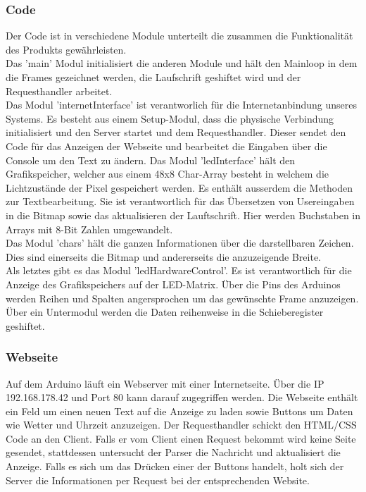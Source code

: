 \documentclass[10pt,a4paper]{article}
\begin{document}
\subsubsection{Code}

Der Code ist in verschiedene Module unterteilt die zusammen die Funktionalität des Produkts gewährleisten.\\
Das 'main' Modul initialisiert die anderen Module und hält den Mainloop in dem die Frames gezeichnet werden, die Laufschrift geshiftet wird und der Requesthandler arbeitet.\\
Das Modul 'internetInterface' ist verantworlich für die Internetanbindung unseres Systems. Es besteht aus einem Setup-Modul, dass die physische Verbindung initialisiert und den Server startet und dem Requesthandler. Dieser sendet den Code für das Anzeigen der Webseite und bearbeitet die Eingaben über die Console um den Text zu ändern. 
Das Modul 'ledInterface' hält den Grafikspeicher, welcher aus einem 48x8 Char-Array besteht in welchem die Lichtzustände der Pixel gespeichert werden. Es enthält ausserdem die Methoden zur Textbearbeitung. Sie ist verantwortlich für das Übersetzen von Usereingaben in die Bitmap sowie das aktualisieren der Lauftschrift. Hier werden Buchstaben in Arrays mit 8-Bit Zahlen umgewandelt.\\
Das Modul 'chars' hält die ganzen Informationen über die darstellbaren Zeichen. Dies sind einerseits die Bitmap und andererseits die anzuzeigende Breite.\\
Als letztes gibt es das Modul 'ledHardwareControl'. Es ist verantwortlich für die Anzeige des Grafikspeichers auf der LED-Matrix. Über die Pins des Arduinos werden Reihen und Spalten angersprochen um das gewünschte Frame anzuzeigen. Über ein Untermodul werden die Daten reihenweise in die Schieberegister geshiftet.\\

\subsubsection{Webseite}

Auf dem Arduino läuft ein Webserver mit einer Internetseite. Über die IP 192.168.178.42 und Port 80 kann darauf zugegriffen werden. Die Webseite enthält ein Feld um einen neuen Text auf die Anzeige zu laden sowie Buttons um Daten wie Wetter und Uhrzeit anzuzeigen. Der Requesthandler schickt den HTML/CSS Code an den Client. Falls er vom Client einen Request bekommt wird keine Seite gesendet, stattdessen untersucht der Parser die Nachricht und aktualisiert die Anzeige. Falls es sich um das Drücken einer der Buttons handelt, holt sich der Server die Informationen per Request bei der entsprechenden Website. \\
\end{document}
